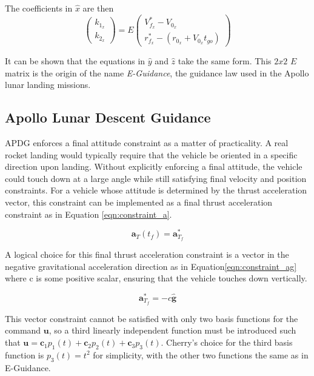 The coefficients in $\hat{x}$ are then
\begin{equation}
\label{eqn:simplelaw}
\begin{pmatrix}
k_{1_x} \\
k_{2_x}
\end{pmatrix}
= E
\begin{pmatrix}
V_{f_x}^* - V_{0_x} \\ 
r_{f_x}^* - (r_{0_x} + V_{0_x}t_{go}) 
\end{pmatrix}
\end{equation}

It can be shown that the equations in $\hat{y}$ and $\hat{z}$ take the same form. This $2x2$ $E$ matrix is the origin of the name \textit{E-Guidance}, the guidance law used in the Apollo lunar landing missions.

\subsection{Apollo Lunar Descent Guidance} \label{sec:APDG}

APDG enforces a final attitude constraint as a matter of practicality. A real rocket landing would typically require that the vehicle be oriented in a specific direction upon landing. Without explicitly enforcing a final attitude, the vehicle could touch down at a large angle while still satisfying final velocity and position constraints. For a vehicle whose attitude is determined by the thrust acceleration vector, this constraint can be implemented as a final thrust acceleration constraint as in Equation \ref{eqn:constraint_a}.

\begin{equation}
\label{eqn:constraint_a}
\bm{a}_T(t_f) = \bm{a}^*_{T_f}
\end{equation}

A logical choice for this final thrust acceleration constraint is a vector in the negative gravitational acceleration direction as in Equation\:\ref{eqn:constraint_ag} where c is some positive scalar, ensuring that the vehicle touches down vertically. 

\begin{equation}
\label{eqn:constraint_ag}
\bm{a}^*_{T_f} = -c\bm{\hat{g}}
\end{equation}

This vector constraint cannot be satisfied with only two basis functions for the command $\bm{u}$, so a third linearly independent function must be introduced such that $\bm{u} = \bm{c}_1 p_1(t) +\bm{c}_2 p_2(t) + \bm{c}_3 p_3(t)$. Cherry's choice for the third basis function is $p_3(t) = t^2$ for simplicity, with the other two functions the same as in E-Guidance.

